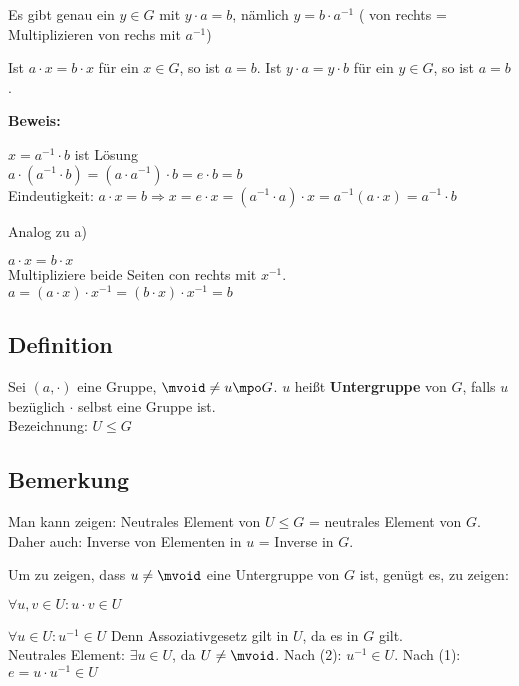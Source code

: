 		\item Es gibt genau ein $y\in G$ mit $y\cdot a=b$, nämlich $y=b\cdot a^{-1}$ ( von rechts = Multiplizieren von rechs mit $a^{-1}$)
		
		\item Ist $a\cdot x=b\cdot x$ für ein $x\in G$, so ist $a=b$. Ist $y\cdot a=y\cdot b$ für ein $y\in G$, so ist $a=b$.
	\subExEnd
	
	\textbf{Beweis:}
		\item $x=a^{-1}\cdot b$ ist Lösung\\
		$a\cdot(a^{-1}\cdot b)=(a\cdot a^{-1})\cdot b=e\cdot b=b$\\
		Eindeutigkeit: $a\cdot x=b\Rightarrow x=e\cdot x=(a^{-1}\cdot a)\cdot x=a^{-1}(a\cdot x)=a^{-1}\cdot b$
		
		\item Analog zu a)
		\item $a\cdot x=b\cdot x$\\
		Multipliziere beide Seiten con rechts mit $x^{-1}$. $a=(a\cdot x)\cdot x^{-1}=(b\cdot x)\cdot x^{-1}=b$
	\subExEnd
	
	\subsection{Definition}
	
	Sei $(a,\cdot)$ eine Gruppe, $\mvoid\neq u\mpo G$. $u$ heißt \textbf{Untergruppe} von $G$, falls $u$ bezüglich $\cdot$ selbst eine Gruppe ist.\\
	Bezeichnung: $U\leq G$
	
	\subsection{Bemerkung}
	
		\item Man kann zeigen: Neutrales Element von $U\leq G$ = neutrales Element von $G$. Daher auch: Inverse von Elementen in $u$ = Inverse in $G$.
		\item Um zu zeigen, dass $u\neq\mvoid$ eine Untergruppe von $G$ ist, genügt es, zu zeigen:
			\item $\forall u,v\in U:u\cdot v\in U$
			\item $\forall u\in U: u^{-1}\in U$
		\subExEnd
		Denn Assoziativgesetz gilt in $U$, da es in $G$ gilt.\\
		Neutrales Element: $\exists u\in U$, da $U\neq\mvoid$. Nach (2): $u^{-1}\in U$. Nach (1): $e=u\cdot u^{-1}\in U$
	\subExEnd
	
